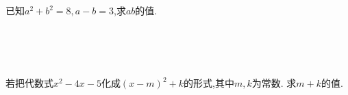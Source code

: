 \begin{comment}
    \item{
        若多项式$ 9x^2 - mx+16$是一个完全平方式,则 $m$的值是多少？
    }
    \\ \\ \\
\end{comment}

\item{
    已知$a^2+b^2=8, a-b=3$,求$ab$的值.
    \iffalse
    \fangsong\zihao{4}
    思路: 看到$a^2+b^2, a-b, ab$, 应该想到完全平方公式.
    \fi
}
\\ \\ \\

\begin{comment}
    \item{
        若$x^2+mx+9$是完全平方式,求常数$m$的值.
    }
    \\ \\ \\

    \item{
        若$x+y=2$,求代数式$x^2-y^2+4y$的值.
    }
    \\ \\ \\
\end{comment}

\item{
    若把代数式$x^2-4x-5$化成$(x-m)^2+k$的形式,其中$m,k$为常数. 求$m+k$的值.
    \iffalse
    \fangsong\zihao{4}
    思路: 把$(x-m)^2+k$转化为$ax^2+bx+c$的形式,再比较各项系数,解出$m,k$.\\
    注意: 系数的位置.

    解答: 
    \begin{align*}
        (x-m)^2+k &= x^2-2mx+m^2+k
    \end{align*}
    与$x^2-4x-5$比较,对应项的系数相等,常数项相等,得到方程
    \[\left\{ 
        \begin{array}{lc}
            2m = 4\\
            m^2+k=-5
        \end{array}
    \right.\]
    解得
    \[\left\{ 
        \begin{array}{lc}
            m = 2\\
            k =-9
        \end{array}
    \right.\]
    $\therefore m+k=-7.$
    \fi
}
\\ \\ \\

